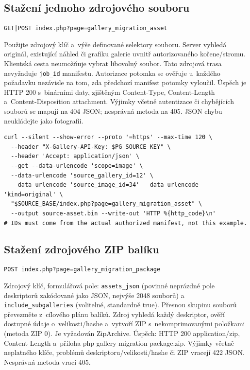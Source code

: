 \documentclass[11pt,a4paper]{article}
\newcommand{\codeword}[1]{\nolinkurl{#1}}
\begin{document}
\subsection{\texorpdfstring{Stažení jednoho zdrojového souboru}{Stažení jednoho zdrojového souboru}}

\label{api352:migration-asset}

\begin{lstlisting}[language={}]
GET|POST index.php?page=gallery_migration_asset
\end{lstlisting}

Použijte zdrojový klíč a~výše definované selektory souboru. Server vyhledá originál,
existující náhled či grafiku galerie uvnitř autorizovaného kořene/stromu. Klientská cesta
neumožňuje vybrat libovolný soubor. Tato zdrojová trasa nevyžaduje \codeword{job_id}
manifestu. Autorizace potomka se ověřuje u~každého požadavku nezávisle na tom, zda předchozí
manifest potomky vyloučil. Úspěch je HTTP 200 s~binárními daty, zjištěným Content-Type,
Content-Length a~Content-Disposition attachment. Výjimky včetně autentizace či chybějících
souborů se mapují na 404 JSON; nesprávná metoda na 405. JSON chybu neukládejte jako
fotografii.

\begin{lstlisting}[language={}]
curl --silent --show-error --proto '=https' --max-time 120 \
  --header "X-Gallery-API-Key: $PG_SOURCE_KEY" \
  --header 'Accept: application/json' \
  --get --data-urlencode 'scope=image' \
  --data-urlencode 'source_gallery_id=12' \
  --data-urlencode 'source_image_id=34' --data-urlencode 'kind=original' \
  "$SOURCE_BASE/index.php?page=gallery_migration_asset" \
  --output source-asset.bin --write-out 'HTTP %{http_code}\n'
# IDs must come from the actual authorized manifest, not this example.
\end{lstlisting}

\subsection{\texorpdfstring{Stažení zdrojového ZIP balíku}{Stažení zdrojového ZIP balíku}}

\label{api352:migration-package}

\begin{lstlisting}[language={}]
POST index.php?page=gallery_migration_package
\end{lstlisting}

Zdrojový klíč, formulářová pole: \codeword{assets_json} (povinné neprázdné pole deskriptorů
zakódované jako JSON, nejvýše 2048 souborů) a \codeword{include_subgalleries} (volitelné,
standardně true). Přesnou skupinu souborů převezměte z~cílového plánu balíků. Zdroj vyhledá
každý deskriptor, ověří dostupné údaje o~velikosti/hashe a~vytvoří ZIP s~nekomprimovanými
položkami (metoda ZIP 0). Je vyžadován ZipArchive. Úspěch: HTTP 200 application/zip,
Content-Length a~příloha php-gallery-migration-package.zip. Výjimky včetně neplatného klíče,
problémů deskriptoru/velikosti/hashe či ZIP vracejí 422 JSON. Nesprávná metoda vrací 405.
\end{document}
